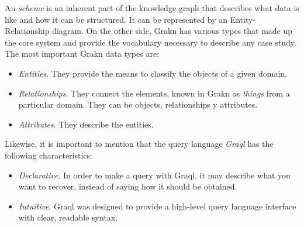 An \textit{scheme} is an inherent part of the knowledge graph that describes 
what data is like and how it can be structured. It can be represented by an 
Entity-Relationship diagram. On the other side, Grakn has various types that 
made up the core system and provide the vocabulary necessary to describe any 
case study. The most important Grakn data types are:

\begin{itemize}
    \item \textit{Entities}. They provide the means to classify the objects of 
    a given domain.
    \item \textit{Relationships}. They connect the elements, known in Grakn as 
        \textit{things} from a particular domain. They can be objects, 
        relationships y attributes.
    \item \textit{Attributes}. They describe the entities.
\end{itemize}

Likewise, it is important to mention that the query language \textit{Graql} 
has the following characteristics:

\begin{itemize}
    \item \textit{Declarative}. In order to make a query with Graql, it may 
        describe what you want to recover, instead of saying how it should be 
        obtained.
    \item \textit{Intuitive}. Graql was designed to provide a high-level 
        query language interface with clear, readable syntax.
\end{itemize}

